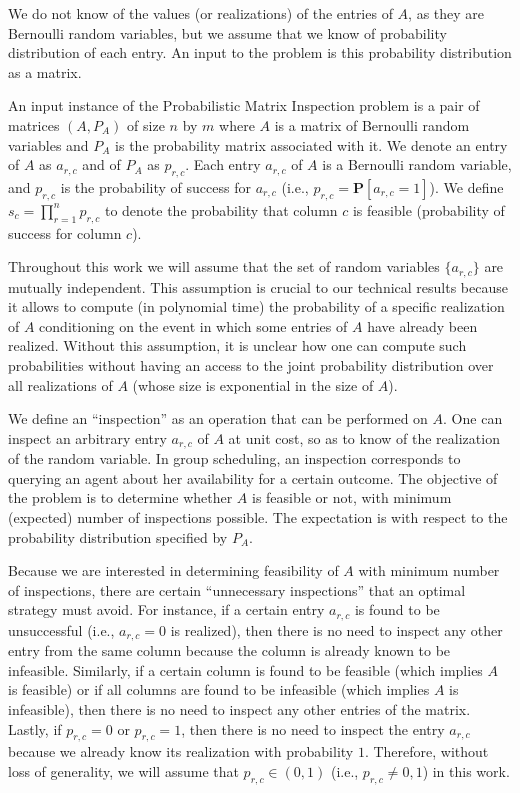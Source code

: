 We do not know of the values (or realizations) of the entries of $A$, as they are Bernoulli random variables, but we assume that we know of probability distribution of each entry. An input to the problem is this probability distribution as a matrix. 
 \begin{definition}
 An input instance of the Probabilistic Matrix Inspection problem is a pair of matrices $(A, P_A)$ of size $n$ by $m$
 where $A$ is a matrix of Bernoulli random variables 
 and $P_A$ is the probability matrix associated with it.
 We denote an entry of $A$ as $a_{r,c}$ and of $P_A$ as $p_{r,c}$.
 Each entry $a_{r,c}$ of $A$ is a Bernoulli random variable, and $p_{r,c}$ is the probability of success for $a_{r,c}$ (i.e., $p_{r,c} = \mathbf{P}[a_{r,c} = 1]$).
 We define $s_c = \prod_{r=1}^{n} p_{r,c}$ to denote the probability that column $c$ is feasible (probability of success for column $c$).
 \end{definition}
 Throughout this work we will assume that the set of random variables $\{a_{r,c}\}$ are mutually independent. This assumption is crucial to our technical results because it allows to compute (in polynomial time) the probability of a specific realization of $A$ conditioning on the event in which some entries of $A$ have already been realized. 
 Without this assumption, it is unclear how one can compute such probabilities without having an access to the joint probability distribution over all realizations of $A$ (whose size is exponential in the size of $A$).

 We define an ``inspection'' as an operation that can be performed on $A$. 
 One can inspect an arbitrary entry $a_{r,c}$ of $A$ at unit cost, so as to know of the realization of the random variable. In group scheduling, an inspection corresponds to querying an agent about her availability for a certain outcome. 
 The objective of the problem is to determine whether $A$ is feasible or not, with minimum (expected) number of inspections possible. The expectation is with respect to the probability distribution specified by $P_A$.

 Because we are interested in determining feasibility of $A$ with minimum number of inspections, there are certain ``unnecessary inspections'' that an optimal strategy must avoid.
 For instance, if a certain entry $a_{r,c}$ is found to be unsuccessful (i.e., $a_{r,c} = 0$ is realized), then there is no need to inspect any other entry from the same column because the column is already known to be infeasible. Similarly, if a certain column is found to be feasible (which implies $A$ is feasible) or if all columns are found to be infeasible (which implies $A$ is infeasible), then there is no need to inspect any other entries of the matrix. Lastly, if $p_{r,c} = 0$ or $p_{r,c} = 1$, then there is no need to inspect the entry $a_{r,c}$ because we already know its realization with probability $1$.
 Therefore, without loss of generality, we will assume that $p_{r,c} \in (0,1)$ (i.e., $p_{r,c}\neq 0,1$) in this work. 

